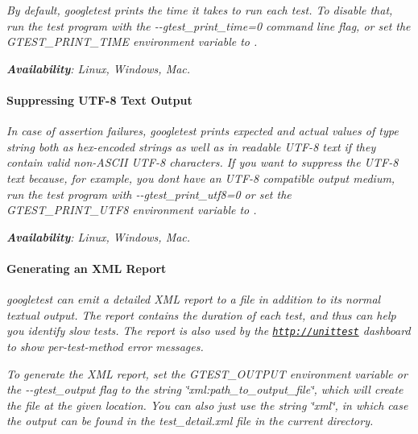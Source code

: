 {\itshape }

{\itshape By default, googletest prints the time it takes to run each test. To disable that, run the test program with the {\ttfamily -\/-\/gtest\+\_\+print\+\_\+time=0} command line flag, or set the G\+T\+E\+S\+T\+\_\+\+P\+R\+I\+N\+T\+\_\+\+T\+I\+ME environment variable to {}.}

{\itshape {\bfseries Availability}\+: Linux, Windows, Mac.}

{\itshape \paragraph*{Suppressing U\+T\+F-\/8 Text Output}}

{\itshape }

{\itshape In case of assertion failures, googletest prints expected and actual values of type {\ttfamily string} both as hex-\/encoded strings as well as in readable U\+T\+F-\/8 text if they contain valid non-\/\+A\+S\+C\+II U\+T\+F-\/8 characters. If you want to suppress the U\+T\+F-\/8 text because, for example, you don\textquotesingle{}t have an U\+T\+F-\/8 compatible output medium, run the test program with {\ttfamily -\/-\/gtest\+\_\+print\+\_\+utf8=0} or set the {\ttfamily G\+T\+E\+S\+T\+\_\+\+P\+R\+I\+N\+T\+\_\+\+U\+T\+F8} environment variable to {}.}

{\itshape {\bfseries Availability}\+: Linux, Windows, Mac.}

{\itshape \paragraph*{Generating an X\+ML Report}}

{\itshape }

{\itshape googletest can emit a detailed X\+ML report to a file in addition to its normal textual output. The report contains the duration of each test, and thus can help you identify slow tests. The report is also used by the \href{http://unittest}{\tt http\+://unittest} dashboard to show per-\/test-\/method error messages.}

{\itshape To generate the X\+ML report, set the {\ttfamily G\+T\+E\+S\+T\+\_\+\+O\+U\+T\+P\+UT} environment variable or the {\ttfamily -\/-\/gtest\+\_\+output} flag to the string {\ttfamily \char`\"{}xml\+:path\+\_\+to\+\_\+output\+\_\+file\char`\"{}}, which will create the file at the given location. You can also just use the string {\ttfamily \char`\"{}xml\char`\"{}}, in which case the output can be found in the {\ttfamily test\+\_\+detail.\+xml} file in the current directory.}

